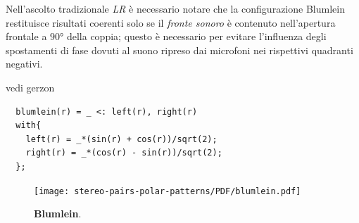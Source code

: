 Nell'ascolto tradizionale \emph{LR} è necessario notare che la configurazione
Blumlein restituisce risultati coerenti solo se il \emph{fronte sonoro} è contenuto
nell’apertura frontale a $90°$ della coppia; questo è necessario per evitare
l’influenza degli spostamenti di fase dovuti al suono ripreso dai microfoni
nei rispettivi quadranti negativi.

vedi gerzon
\begin{lstlisting}
  blumlein(r) = _ <: left(r), right(r)
  with{
    left(r) = _*(sin(r) + cos(r))/sqrt(2);
    right(r) = _*(cos(r) - sin(r))/sqrt(2);
  };
\end{lstlisting}
\begin{figure}[h]
\begin{center}
\texttt{[image: stereo-pairs-polar-patterns/PDF/blumlein.pdf]}
\caption{\textbf{Blumlein}.}
\label{blumlein}
\end{center}
\end{figure}
%
%
